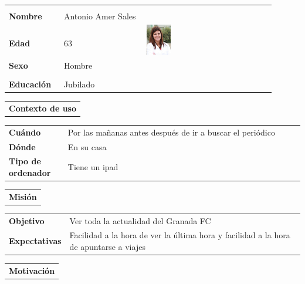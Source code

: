 \documentclass[11pt]{article}
\begin{document}
\begin{table}[H]
  \centering
	\begin{tabular}{p{0.2\linewidth}|p{0.3\linewidth}p{0.475\linewidth}}
    \toprule
    \textbf{Nombre} & Antonio Amer Sales &\multirow{4}{*}{\begin{minipage}{1.\textwidth}\includegraphics[width=0.2\textwidth, height=30mm]{Ana}\end{minipage}}\\\\
    \textbf{Edad} & 63 & \\
    \textbf{Sexo} & Hombre & \\
    \textbf{Educación} & Jubilado & \\
    \bottomrule
  \end{tabular}

  \begin{tabular}{l}
    \textbf{Contexto de uso} 
  \end{tabular}
  
  \begin{tabular}{p{0.2\linewidth}|p{0.8\linewidth}}
    \toprule
    \textbf{Cuándo} & Por las mañanas antes después de ir a buscar el periódico\\
    \textbf{Dónde}  & En su casa\\
    \textbf{Tipo de ordenador} & Tiene un ipad\\
    \bottomrule
  \end{tabular}

  \begin{tabular}{l}
    \textbf{Misión} 
  \end{tabular}
  
  \begin{tabular}{p{0.2\linewidth}|p{0.8\linewidth}}
    \toprule
    \textbf{Objetivo} & Ver toda la actualidad del Granada FC \\
    \textbf{Expectativas}  & Facilidad a la hora de ver la última hora y facilidad a la hora de apuntarse a viajes\\
    \bottomrule
  \end{tabular}

  \begin{tabular}{l}
    \textbf{Motivación} 
  \end{tabular}


\end{table}
\end{document}
